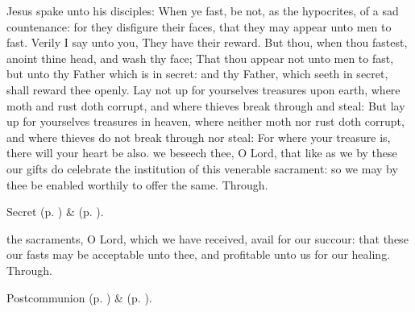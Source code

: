  Jesus spake unto his disciples: When ye fast, be not, as the hypocrites, of a sad countenance: for they disfigure their faces, that they may appear unto men to fast. Verily I say unto you, They have their reward. But thou, when thou fastest, anoint thine head, and wash thy face; That thou appear not unto men to fast, but unto thy Father which is in secret: and thy Father, which seeth in secret, shall reward thee openly. Lay not up for yourselves treasures upon earth, where moth and rust doth corrupt, and where thieves break through and steal: But lay up for yourselves treasures in heaven, where neither moth nor rust doth corrupt, and where thieves do not break through nor steal: For where your treasure is, there will your heart be also.
\secret\label{AshWednesdayMassSecret}
 we beseech thee, O Lord, that like as we by these our gifts do celebrate the institution of this venerable sacrament: so we may by thee be enabled worthily to offer the same. Through.
\begin{rubric}
     Secret  (p. \pageref{SPSaints}) \&   (p. \pageref{SPLivingDeparted}).
\end{rubric}
\postcommunion\label{AshWednesdayMassPostcommunion}
 the sacraments, O Lord, which we have received, avail for our succour: that these our fasts may be acceptable unto thee, and profitable unto us for our healing. Through.
\begin{rubric}
     Postcommunion  (p. \pageref{SPSaints}) \&   (p. \pageref{SPLivingDeparted}).
\end{rubric}

